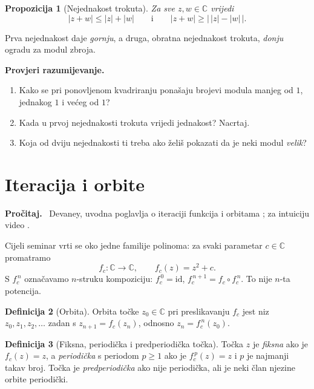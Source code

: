 \documentclass[11pt,a4paper]{article}
\theoremstyle{definition}
\newtheorem{definicija}{Definicija}[section]
\theoremstyle{plain}
\newtheorem{propozicija}[definicija]{Propozicija}
\newenvironment{citaj}
  {\par\medskip\noindent\textbf{\color{blue!60!black}Pročitaj.}\ }
  {\par\medskip}
\newenvironment{pitanja}
  {\par\noindent\textbf{\color{orange!70!black}Provjeri razumijevanje.}
   \begin{enumerate}[label=\arabic*., nosep]}
  {\end{enumerate}\medskip}
\newcommand{\C}{\mathbb{C}}
\begin{document}
\begin{propozicija}[Nejednakost trokuta]
Za sve $z, w \in \C$ vrijedi
\[
  |z + w| \le |z| + |w|
  \qquad\text{i}\qquad
  |z + w| \ge \bigl|\, |z| - |w| \,\bigr|.
\]
\end{propozicija}

Prva nejednakost daje \emph{gornju}, a druga, obratna nejednakost trokuta,
\emph{donju} ogradu za modul zbroja.

\begin{pitanja}
  \item Kako se pri ponovljenom kvadriranju ponašaju brojevi modula manjeg od
        $1$, jednakog $1$ i većeg od $1$?
  \item Kada u prvoj nejednakosti trokuta vrijedi jednakost? Nacrtaj.
  \item Koja od dviju nejednakosti ti treba ako želiš pokazati da je neki
        modul \emph{velik}?
\end{pitanja}

\section{Iteracija i orbite}
\label{sec:orbite}

\begin{citaj}
Devaney, uvodna poglavlja o iteraciji funkcija i orbitama
\cite{devaney_first_course}; za intuiciju video \cite{numberphile_mandelbrot}.
\end{citaj}

Cijeli seminar vrti se oko jedne familije polinoma: za svaki parametar
$c \in \C$ promatramo
\[
  f_c \colon \C \to \C, \qquad f_c(z) = z^2 + c.
\]
S $f_c^{\,n}$ označavamo $n$-struku kompoziciju: $f_c^{\,0} = \mathrm{id}$,
$f_c^{\,n+1} = f_c \circ f_c^{\,n}$. To nije $n$-ta potencija.

\begin{definicija}[Orbita]
Orbita točke $z_0 \in \C$ pri preslikavanju $f_c$ jest niz
$z_0, z_1, z_2, \dots$ zadan s $z_{n+1} = f_c(z_n)$, odnosno
$z_n = f_c^{\,n}(z_0)$.
\end{definicija}

\begin{definicija}[Fiksna, periodička i predperiodička točka]
Točka $z$ je \emph{fiksna} ako je $f_c(z) = z$, a \emph{periodička} s
periodom $p \ge 1$ ako je $f_c^{\,p}(z) = z$ i $p$ je najmanji takav broj.
Točka je \emph{predperiodička} ako nije periodička, ali je neki član njezine
orbite periodički.
\end{definicija}
\end{document}
